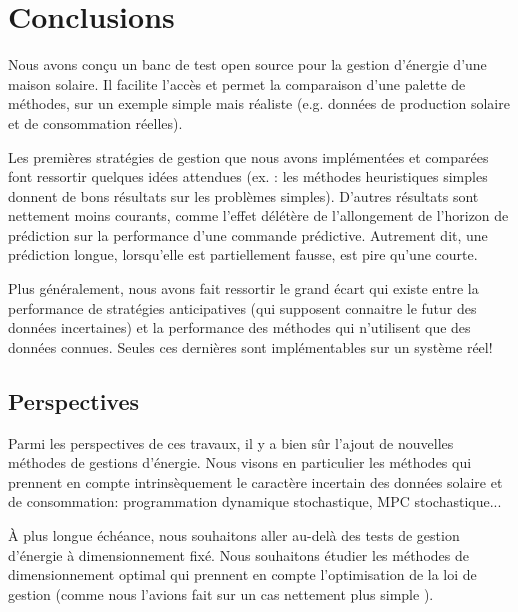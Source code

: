 \documentclass[a4paper,10pt,twocolumn]{article}
\begin{document}
% 

\section{Conclusions}

Nous avons conçu un banc de test open source pour la gestion d'énergie d'une maison solaire.
Il facilite l'accès et permet la comparaison d'une palette de méthodes,
sur un exemple simple mais réaliste (e.g. données de production solaire et de consommation réelles).

Les premières stratégies de gestion que nous avons implémentées et comparées
font ressortir quelques idées attendues
(ex. : les méthodes heuristiques simples donnent de bons résultats sur les problèmes simples).
D'autres résultats sont nettement moins courants, comme l'effet délétère
de l'allongement de l'horizon de prédiction sur la performance d'une commande prédictive.
Autrement dit, une prédiction longue, lorsqu'elle est partiellement fausse, est pire qu'une courte.

Plus généralement, nous avons fait ressortir le grand écart qui existe
entre la performance de stratégies anticipatives (qui supposent connaitre le futur des données incertaines)
et la performance des méthodes qui n'utilisent que des données connues.
Seules ces dernières sont implémentables sur un système réel!

\subsection{Perspectives}
Parmi les perspectives de ces travaux, il y a bien sûr l'ajout de nouvelles méthodes
de gestions d'énergie.
Nous visons en particulier les méthodes qui prennent en compte intrinsèquement
le caractère incertain des données solaire et de consommation:
programmation dynamique stochastique, MPC stochastique...

À plus longue échéance, nous souhaitons aller au-delà
des tests de gestion d'énergie à dimensionnement fixé.
Nous souhaitons étudier les méthodes de dimensionnement optimal
qui prennent en compte l'optimisation de la loi de gestion
(comme nous l'avions fait sur un cas nettement plus simple \cite{Haessig:2014:SGE}).




\end{document}
